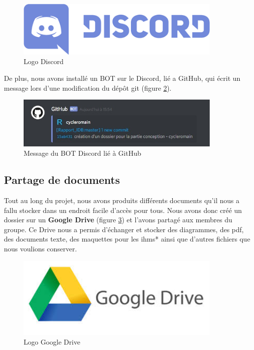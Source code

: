 \begin{figure}[!h]
\centering
\includegraphics[width=10cm]{./images/activite/discordLogo.png}
\caption{Logo Discord}
\label{discord_logo}
\end{figure}

De plus, nous avons installé un BOT sur le Discord, lié a GitHub, qui écrit un message lors d'une modification du dép\^ot git (figure \ref{bot_discord}).

\begin{figure}[!h]
\centering
\includegraphics[width=10cm]{./images/activite/bot_discord.jpg}
\caption{Message du BOT Discord lié à GitHub}
\label{bot_discord}
\end{figure}



\subsection{Partage de documents}
Tout au long du projet, nous avons produits différents documents qu'il nous a fallu stocker dans un endroit facile d'accès pour tous. Nous avons donc créé un dossier sur un \textbf{Google Drive} (figure \ref{googledrive_logo}) et l'avons partagé aux membres du groupe. Ce Drive nous a permis d'échanger et stocker des diagrammes, des pdf, des documents texte, des maquettes pour les \glspl{ihm}* ainsi que d'autres fichiers que nous voulions conserver.

\begin{figure}[!h]
\centering
\includegraphics[width=10cm]{./images/activite/googleDriveLogo.jpg}
\caption{Logo Google Drive}
\label{googledrive_logo}
\end{figure}



